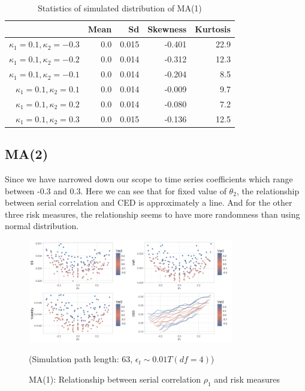 \documentclass[11pt]{article}
\begin{document}
\begin{table}[H]
\centering
\begin{tabular}{|r |r r r r|}
\hline
& Mean & Sd & Skewness & Kurtosis \\
\hline
$\kappa_1 = 0.1, \kappa_2 = -0.3$ & 0.0 & 0.015 & -0.401 & 22.9\\
$\kappa_1 = 0.1, \kappa_2 = -0.2$ & 0.0 & 0.014 & -0.312 & 12.3\\
$\kappa_1 = 0.1, \kappa_2 = -0.1$ & 0.0 & 0.014 & -0.204 & 8.5\\
$\kappa_1 = 0.1, \kappa_2 = 0.1$ & 0.0 & 0.014 & -0.009 & 9.7\\
$\kappa_1 = 0.1, \kappa_2 = 0.2$ & 0.0 & 0.014 & -0.080 & 7.2\\
$\kappa_1 = 0.1, \kappa_2 = 0.3$ & 0.0 & 0.015 & -0.136 & 12.5\\
\hline
\end{tabular}
\caption{Statistics of simulated distribution of MA(1)}
\label{table: T_dist_MA1_return}
\end{table}

\subsection{MA(2)}

Since we have narrowed down our scope to time series coefficients which range between -0.3 and 0.3. Here we can see that for fixed value of $\theta_2$, the relationship between serial correlation and CED is approximately a line. And for the other three risk measures, the relationship seems to have more randomness than using normal distribution. 

\begin{figure}[H]
\centering
\includegraphics[width = 0.8\textwidth]{../figures/simulation/T_dist_MA2_risk_measures}
\caption{MA(1): Relationship between serial correlation $\rho_1$ and risk measures}
(Simulation path length: 63, $\epsilon_t \sim 0.01T(df = 4)$)
\label{fig:T_dist_MA2_risk_measures}
\end{figure}
\end{document}
